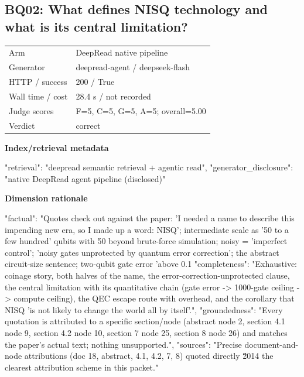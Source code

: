 \documentclass[10pt]{article}
\begin{document}
\subsection{BQ02: What defines NISQ technology and what is its central limitation?}
\begin{tabular}{@{}ll@{}}
Arm & DeepRead native pipeline\\
Generator & deepread-agent / deepseek-flash\\
HTTP / success & 200 / True\\
Wall time / cost & 28.4 s / not recorded\\
Judge scores & F=5, C=5, G=5, A=5; overall=5.00\\
Verdict & correct\\
\end{tabular}

\textbf{Index/retrieval metadata}
\begin{EvidenceText}
{
  "retrieval": "deepread semantic retrieval + agentic read",
  "generator_disclosure": "native DeepRead agent pipeline (disclosed)"
}
\end{EvidenceText}

\textbf{Dimension rationale}
\begin{EvidenceText}
{
  "factual": "Quotes check out against the paper: 'I needed a name to describe this impending new era, so I made up a word: NISQ'; intermediate scale as '50 to a few hundred' qubits with 50 beyond brute-force simulation; noisy = 'imperfect control'; 'noisy gates unprotected by quantum error correction'; the abstract circuit-size sentence; two-qubit gate error 'above 0.1%
  "completeness": "Exhaustive: coinage story, both halves of the name, the error-correction-unprotected clause, the central limitation with its quantitative chain (gate error -> 1000-gate ceiling -> compute ceiling), the QEC escape route with overhead, and the corollary that NISQ 'is not likely to change the world all by itself'.",
  "groundedness": "Every quotation is attributed to a specific section/node (abstract node 2, section 4.1 node 9, section 4.2 node 10, section 7 node 25, section 8 node 26) and matches the paper's actual text; nothing unsupported.",
  "sources": "Precise document-and-node attributions (doc 18, abstract, 4.1, 4.2, 7, 8) quoted directly \u2014 the clearest attribution scheme in this packet."
}
\end{EvidenceText}
\end{document}
